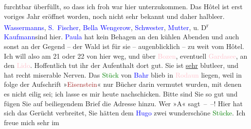                furchtbar überfüllt, so dass ich froh war hier unterzukommen. Das Hôtel ist  erst voriges Jahr eröffnet worden, noch nicht sehr
               bekannt und daher halbleer.\pend
           \pstart
           \textcolor{blue}{Wassermanns}{}\ledrightnote{\textcolor{blue}{Jakob Wassermann}{\newline}\textcolor{blue}{Julie Wassermann}}, \textcolor{blue}{S. Fischer}{}\ledrightnote{\textcolor{blue}{Samuel Fischer}}, \textcolor{blue}{Bella Wengerow}{}\ledrightnote{\textcolor{blue}{Isabella Vengerova}},
                  \textcolor{blue}{Schwester}{}, \textcolor{blue}{Mutter}{}, u. D\textsuperscript{r}{ }\textcolor{blue}{Kaufmann}{}\ledrightnote{\textcolor{blue}{Arthur Kaufmann}}{ }{\pb}sind hier. \textcolor{blue}{Paula}{}\ledrightnote{\textcolor{blue}{Paula Beer-Hofmann}} hat kein Behagen an den kühlen Abenden und auch sonst an
               der Gegend – der Wald ist für sie – augenblicklich – zu weit vom Hôtel. Ich will also
               am 21 oder 22 von hier weg, und über \textcolor{pink}{Bozen}{}\ledrightnote{\textcolor{pink}{Bozen}}, eventuell \textcolor{pink}{Gardasee}{}\ledrightnote{\textcolor{pink}{Lago di Garda}}, an
               den \textcolor{pink}{Lido}{}\ledrightnote{\textcolor{pink}{Lido}}. Hoffentlich tut ihr der Aufenthalt dort
               gut. Sie ist \uline{sehr} blutleer, und hat recht miserable
               Nerven. Das \textcolor{green}{Stück}{} von \textcolor{blue}{Bahr}{}\ledrightnote{\textcolor{blue}{Hermann Bahr}} blieb in \textcolor{pink}{Rodaun}{}\ledrightnote{\textcolor{pink}{Rodaun}} liegen, weil in folge der Aufschrift {\pb}»\textcolor{brown}{Eisenstein}{}« nur Bücher darin vermutet wurden, mit denen es nicht eilig sei;
               ich lasse es mir heute nachschicken.\pend
           \pstart
           Bitte sind Sie so gut und fügen Sie auf beiliegendem Brief die Adresse hinzu. Wer »A«
               sagt – –!\pend
           \pstart
           Hier hat sich das Gerücht verbreitet, Sie hätten dem \textcolor{blue}{Hugo}{}\ledrightnote{\textcolor{blue}{Hugo von Hofmannsthal}} zwei wunderschöne \textcolor{green}{Stücke}{}\label{K_L01542_2v}\label{K_L01542_2h}. Ich freue mich sehr im
